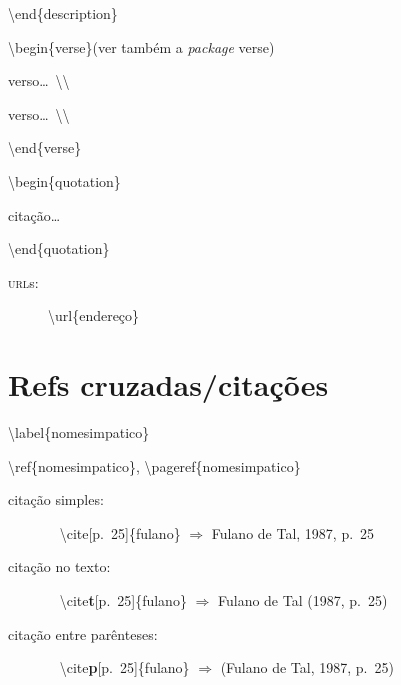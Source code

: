 \documentclass[11pt,twoside,english,brazilian]{article}
\begin{document}
\begin{multicols}{3}
\textbackslash{}end\{description\}


\vspace{\baselineskip}


\textbackslash{}begin\{verse\}\quad (ver também a \textit{package} \textsf{verse})

\quad verso\dots\ \textbackslash\textbackslash

\quad verso\dots\ \textbackslash\textbackslash

\textbackslash{}end\{verse\}


\vspace{\baselineskip}


\textbackslash{}begin\{quotation\}

\quad citação\dots

\textbackslash{}end\{quotation\}


\vspace{\baselineskip}


\begin{description}
    \item[\textsc{url}s:] \textbackslash{}url\{endereço\}
\end{description}

\section*{Refs cruzadas/citações}

\textbackslash{}label\{nomesimpatico\}

\textbackslash{}ref\{nomesimpatico\},
\textbackslash{}pageref\{nomesimpatico\}


\vspace{\baselineskip}


\begin{description}
\item[citação simples:]~\vspace{2pt}\newline
    \null\quad\textbackslash{}cite[p.~25]\{fulano\} $\Rightarrow$ Fulano de Tal, 1987, p.~25\vspace{6pt}

  \item[citação no texto:]~\vspace{2pt}\newline
    \null\quad\textbackslash{}cite\textbf{t}[p.~25]\{fulano\} $\Rightarrow$ Fulano de Tal (1987, p.~25)\vspace{6pt}

  \item[citação entre parênteses:]~\vspace{2pt}\newline
    \null\quad\textbackslash{}cite\textbf{p}[p.~25]\{fulano\} $\Rightarrow$ (Fulano de Tal, 1987, p.~25)
\end{description}


\end{multicols}
\end{document}
